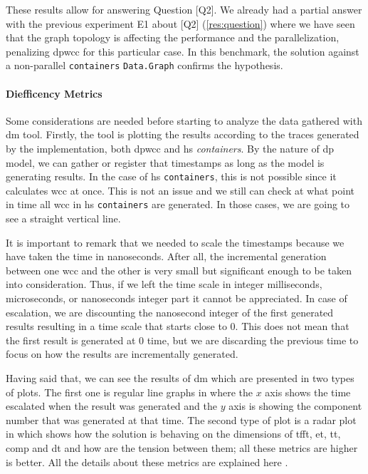   These results allow for answering Question [Q2].
  We already had a partial answer with the previous experiment E1 about [Q2] (\autoref{res:question}) where we have seen that the graph topology is affecting the performance and the parallelization, penalizing \acrshort{dpwcc} for this particular case. In this benchmark, the solution against a non-parallel \texttt{containers} \texttt{Data.Graph} confirms the hypothesis. 
  
  \paragraph{Diefficency Metrics}\label{sub:sub:sec:e2}
  Some considerations are needed before starting to analyze the data gathered with \acrshort{dm} tool. Firstly, the tool is plotting the results according to the traces generated by the implementation, both \acrshort{dpwcc} and \acrshort{hs} \emph{containers}. By the nature of \acrshort{dp} model, we can gather or register that timestamps as long as the model is generating results. In the case of \acrshort{hs} \texttt{containers}, this is not possible since it calculates \acrshort{wcc} at once. This is not an issue and we still can check at what point in time all \acrshort{wcc} in \acrshort{hs} \texttt{containers} are generated. In those cases, we are going to see a straight vertical line. 
  
  It is important to remark that we needed to scale the timestamps because we have taken the time in nanoseconds. After all, the incremental generation between one \acrshort{wcc} and the other is very small but significant enough to be taken into consideration. Thus, if we left the time scale in integer milliseconds, microseconds, or nanoseconds integer part it cannot be appreciated. In case of escalation, we are discounting the nanosecond integer of the first generated results resulting in a time scale that starts close to $0$. This does not mean that the first result is generated at $0$ time, but we are discarding the previous time to focus on how the results are incrementally generated.
  
  Having said that, we can see the results of \acrshort{dm} which are presented in two types of plots. The first one is regular line graphs in where the $x$ axis shows the time escalated when the result was generated and the $y$ axis is showing the component number that was generated at that time. The second type of plot is a radar plot in which shows how the solution is behaving on the dimensions of  \acrfull{tfft}, \acrfull{et}, \acrfull{tt}, \acrfull{comp} and \acrfull{dt} and how are the tension between them; all these metrics are higher is better. All the details about these metrics are explained here \cite{diefpaper}.
  
